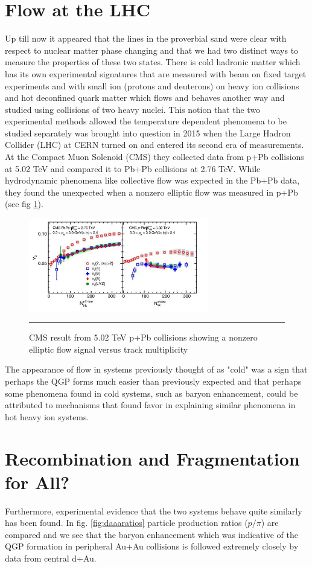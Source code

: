 \section{Flow at the LHC}
Up till now it appeared that the lines in the proverbial sand were clear with respect to nuclear matter phase changing and that we had two distinct ways to measure the properties of these two states. There is cold hadronic matter which has its own experimental signatures that are measured with beam on fixed target experiments and with small ion (protons and deuterons) on heavy ion collisions and hot deconfined quark matter which flows and behaves another way and studied using collisions of two heavy nuclei. This notion that the two experimental methods allowed the temperature dependent phenomena to be studied separately was brought into question in 2015 when the Large Hadron Collider (LHC) at CERN turned on and entered its second era of measurements. At the Compact Muon Solenoid (CMS) they collected data from p+Pb collisions at 5.02 TeV and compared it to Pb+Pb collisions at 2.76 TeV. While hydrodynamic phenomena like collective flow was expected in the Pb+Pb data, they found the unexpected when a nonzero elliptic flow was measured in p+Pb (see fig \ref{fig:pPbflow}).
\begin{figure}[htbp!]
  \centering
    \includegraphics[width=0.7\textwidth]{prevplots/pPbflowLHC.JPG}
    \rule{35em}{0.5pt}
  \caption[Elliptic Flow in p+Pb at the LHC]{CMS result from 5.02 TeV p+Pb collisions showing a nonzero elliptic flow signal versus track multiplicity}
  \label{fig:pPbflow}
\end{figure} 

The appearance of flow in systems previously thought of as "cold" was a sign that perhaps the QGP forms much easier than previously expected and that perhaps some phenomena found in cold systems, such as baryon enhancement, could be attributed to mechanisms that found favor in explaining similar phenomena in hot heavy ion systems.

\section{Recombination and Fragmentation for All?}
Furthermore, experimental evidence that the two systems behave quite similarly has been found. In fig. \ref{fig:daaaratios} particle production ratios ($p/\pi$) are compared and we see that the baryon enhancement which was indicative of the QGP formation in peripheral Au+Au collisions is followed extremely closely by data from central d+Au. 

